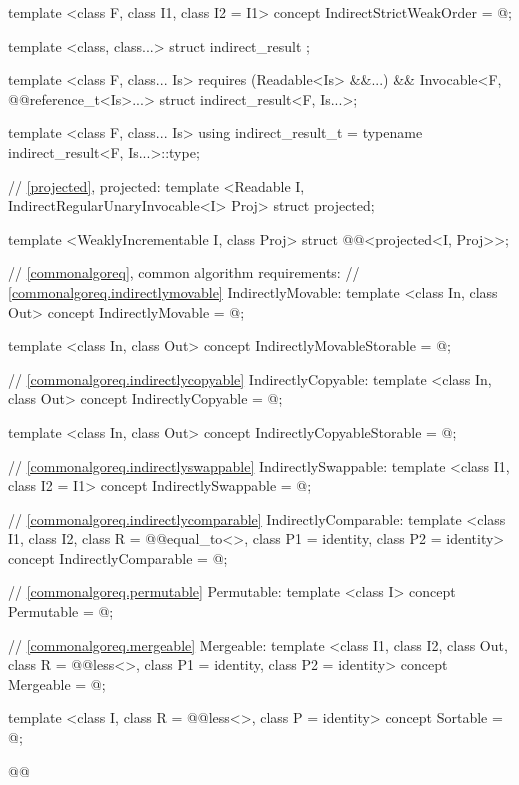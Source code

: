 \begin{codeblock}
{  template <class F, class I1, class I2 = I1>
  concept IndirectStrictWeakOrder = @\seebelow@;

  template <class, class...> struct indirect_result { };

  template <class F, class... Is>
    requires (Readable<Is> &&...) && Invocable<F, @@reference_t<Is>...>
  struct indirect_result<F, Is...>;

  template <class F, class... Is>
  using indirect_result_t = typename indirect_result<F, Is...>::type;

  // \ref{projected}, projected:
  template <Readable I, IndirectRegularUnaryInvocable<I> Proj>
  struct projected;

  template <WeaklyIncrementable I, class Proj>
  struct @@<projected<I, Proj>>;

  // \ref{commonalgoreq}, common algorithm requirements:
  // \ref{commonalgoreq.indirectlymovable} IndirectlyMovable:
  template <class In, class Out>
  concept IndirectlyMovable = @\seebelow@;

  template <class In, class Out>
  concept IndirectlyMovableStorable = @\seebelow@;

  // \ref{commonalgoreq.indirectlycopyable} IndirectlyCopyable:
  template <class In, class Out>
  concept IndirectlyCopyable = @\seebelow@;

  template <class In, class Out>
  concept IndirectlyCopyableStorable = @\seebelow@;

  // \ref{commonalgoreq.indirectlyswappable} IndirectlySwappable:
  template <class I1, class I2 = I1>
  concept IndirectlySwappable = @\seebelow@;

  // \ref{commonalgoreq.indirectlycomparable} IndirectlyComparable:
  template <class I1, class I2, class R = @@equal_to<>, class P1 = identity,
      class P2 = identity>
  concept IndirectlyComparable = @\seebelow@;

  // \ref{commonalgoreq.permutable} Permutable:
  template <class I>
  concept Permutable = @\seebelow@;

  // \ref{commonalgoreq.mergeable} Mergeable:
  template <class I1, class I2, class Out,
      class R = @@less<>, class P1 = identity, class P2 = identity>
  concept Mergeable = @\seebelow@;

  template <class I, class R = @@less<>, class P = identity>
  concept Sortable = @\seebelow@;

  @@

}
\end{codeblock}

